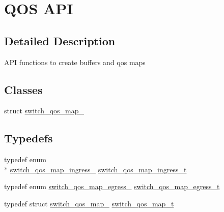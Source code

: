 \hypertarget{group__QOS}{\section{Q\+O\+S A\+P\+I}
\label{group__QOS}
}


\subsection{Detailed Description}
A\+P\+I functions to create buffers and qos maps \subsection*{Classes}
\begin{DoxyCompactItemize}
\item 
struct \hyperlink{structswitch__qos__map__}{switch\+\_\+qos\+\_\+map\+\_\+}
\end{DoxyCompactItemize}
\subsection*{Typedefs}
\begin{DoxyCompactItemize}
\item 
typedef enum \\*
\hyperlink{group__QOS_ga31ec012ceb021095a2de97a1a3438612}{switch\+\_\+qos\+\_\+map\+\_\+ingress\+\_\+} \hyperlink{group__QOS_ga36b806f4d365145c9c3466c6db87383a}{switch\+\_\+qos\+\_\+map\+\_\+ingress\+\_\+t}
\item 
typedef enum \hyperlink{group__QOS_ga0ad3378e0f7558be2c199c5665436c39}{switch\+\_\+qos\+\_\+map\+\_\+egress\+\_\+} \hyperlink{group__QOS_gae2c7461832eaa401343e50bc7e418b83}{switch\+\_\+qos\+\_\+map\+\_\+egress\+\_\+t}
\item 
typedef struct \hyperlink{structswitch__qos__map__}{switch\+\_\+qos\+\_\+map\+\_\+} \hyperlink{group__QOS_gaa37a048e432bfdb7113ab1c1a28f52ff}{switch\+\_\+qos\+\_\+map\+\_\+t}
\end{DoxyCompactItemize}
